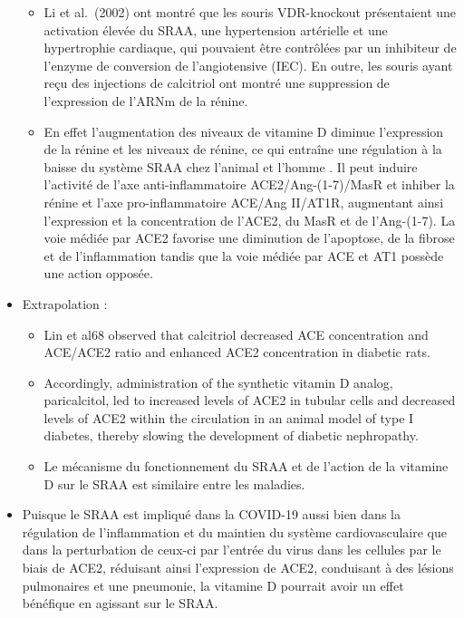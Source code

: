 \documentclass[
  a4paper,
  DIV=11,
  numbers=noendperiod,
  listof=totoc]{scrreprt}
\begin{document}
\begin{itemize}
  \begin{itemize}
  \item
    Li et al.~(2002) ont montré que les souris VDR-knockout présentaient
    une activation élevée du SRAA, une hypertension artérielle et une
    hypertrophie cardiaque, qui pouvaient être contrôlées par un
    inhibiteur de l'enzyme de conversion de l'angiotensive (IEC). En
    outre, les souris ayant reçu des injections de calcitriol ont montré
    une suppression de l'expression de l'ARNm de la rénine.
  \item
    En effet l'augmentation des niveaux de vitamine D diminue
    l'expression de la rénine et les niveaux de rénine, ce qui entraîne
    une régulation à la baisse du système \ac{SRAA} chez l'animal et
    l'homme \autocite{Li.2004,Schwalfenberg.2007}. Il peut induire
    l'activité de l'axe anti-inflammatoire ACE2/Ang-(1-7)/MasR et
    inhiber la rénine et l'axe pro-inflammatoire ACE/Ang II/AT1R,
    augmentant ainsi l'expression et la concentration de l'ACE2, du MasR
    et de l'Ang-(1-7). La voie médiée par \ac{ACE2} favorise une
    diminution de l'apoptose, de la fibrose et de l'inflammation tandis
    que la voie médiée par ACE et AT1 possède une action opposée.
  \end{itemize}
\item
  Extrapolation :

  \begin{itemize}
  \item
    Lin et al68 observed that calcitriol decreased ACE concentration and
    ACE/ACE2 ratio and enhanced ACE2 concentration in diabetic rats.
  \item
    Accordingly, administration of the synthetic vitamin D analog,
    paricalcitol, led to increased levels of ACE2 in tubular cells and
    decreased levels of ACE2 within the circulation in an animal model
    of type I diabetes, thereby slowing the development of diabetic
    nephropathy.
  \item
    Le mécanisme du fonctionnement du SRAA et de l'action de la vitamine
    D sur le SRAA est similaire entre les maladies.
  \end{itemize}
\item
  Puisque le \ac{SRAA} est impliqué dans la COVID-19 aussi bien dans la
  régulation de l'inflammation et du maintien du système
  cardiovasculaire que dans la perturbation de ceux-ci par l'entrée du
  virus dans les cellules par le biais de \ac{ACE2}, réduisant ainsi
  l'expression de \ac{ACE2}, conduisant à des lésions pulmonaires et une
  pneumonie, la vitamine D pourrait avoir un effet bénéfique en agissant
  sur le \ac{SRAA}.
\end{itemize}
\end{document}
